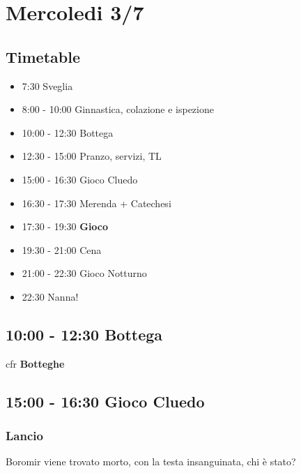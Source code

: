 \documentclass[../main.tex]{subfiles}
\begin{document}
   \section{Mercoledi 3/7}
   \subsection{Timetable}
   \begin{itemize}
        \item 7:30 Sveglia
        \item 8:00 - 10:00 Ginnastica, colazione e ispezione
        \item 10:00 - 12:30 Bottega
        \item 12:30 - 15:00 Pranzo, servizi, TL
        \item 15:00 - 16:30 Gioco Cluedo
        \item 16:30 - 17:30 Merenda + Catechesi
        \item 17:30 - 19:30 \textbf{Gioco}
        \item 19:30 - 21:00 Cena
        \item 21:00 - 22:30 Gioco Notturno
        \item 22:30 Nanna!
    \end{itemize}

   \subsection{10:00 - 12:30 Bottega}
   cfr \textbf{Botteghe}

    \subsection{15:00 - 16:30 Gioco Cluedo}
        \subsubsection{Lancio}
        Boromir viene trovato morto, con la testa insanguinata, chi è stato?
\end{document}
